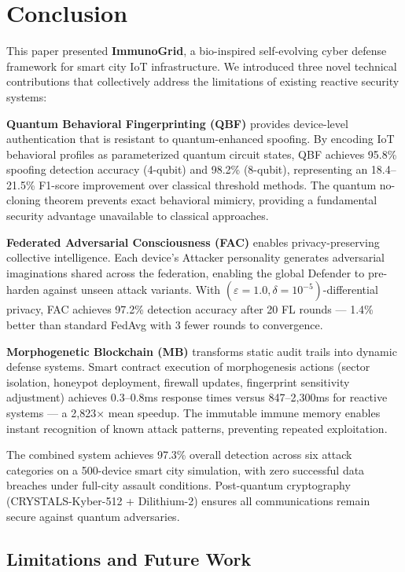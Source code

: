 
\section{Conclusion}
\label{sec:conclusion}

This paper presented \textbf{ImmunoGrid}, a bio-inspired self-evolving cyber
defense framework for smart city IoT infrastructure. We introduced three novel
technical contributions that collectively address the limitations of existing
reactive security systems:

\textbf{Quantum Behavioral Fingerprinting (QBF)} provides device-level
authentication that is resistant to quantum-enhanced spoofing. By encoding
IoT behavioral profiles as parameterized quantum circuit states, QBF achieves
95.8\% spoofing detection accuracy (4-qubit) and 98.2\% (8-qubit), representing
an 18.4--21.5\% F1-score improvement over classical threshold methods.
The quantum no-cloning theorem prevents exact behavioral mimicry, providing
a fundamental security advantage unavailable to classical approaches.

\textbf{Federated Adversarial Consciousness (FAC)} enables privacy-preserving
collective intelligence. Each device's Attacker personality generates
adversarial imaginations shared across the federation, enabling the global
Defender to pre-harden against unseen attack variants. With
$(\varepsilon=1.0, \delta=10^{-5})$-differential privacy, FAC achieves
97.2\% detection accuracy after 20 FL rounds — 1.4\% better than standard
FedAvg with 3 fewer rounds to convergence.

\textbf{Morphogenetic Blockchain (MB)} transforms static audit trails into
dynamic defense systems. Smart contract execution of morphogenesis actions
(sector isolation, honeypot deployment, firewall updates, fingerprint sensitivity
adjustment) achieves 0.3--0.8ms response times versus 847--2,300ms for reactive
systems — a 2,823× mean speedup. The immutable immune memory enables instant
recognition of known attack patterns, preventing repeated exploitation.

The combined system achieves 97.3\% overall detection across six attack
categories on a 500-device smart city simulation, with zero successful
data breaches under full-city assault conditions. Post-quantum cryptography
(CRYSTALS-Kyber-512 + Dilithium-2) ensures all communications remain secure
against quantum adversaries.

\subsection{Limitations and Future Work}

